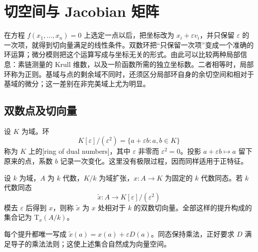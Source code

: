 
% 
% 

\section{切空间与 Jacobian 矩阵}
\label{g5:sec:0503}

在方程 \(f(x_1,\ldots,x_n)=0\) 上选定一点以后，把坐标改为 \(x_i+\varepsilon v_i\)，并只保留 \(\varepsilon\) 的一次项，就得到切向量满足的线性条件。双数环把“只保留一次项”变成一个准确的环运算；微分模则把这个运算写成与坐标无关的形式。由此可以比较两种局部信息：素链测量的 Krull 维数，以及一阶函数所需的独立坐标数。二者相等时，局部环称为正则。基域与点的剩余域不同时，还须区分局部环自身的余切空间和相对于基域的微分；这一差别在非完美域上尤为明显。

\subsection{双数点及切向量}
\label{g5:subsec:0503:01}

设 \(K\) 为域。环
\[
	K[\varepsilon]/(\varepsilon^2)
	=\{a+\varepsilon b:a,b\in K\}
\]
称为 \(K\) 上的[ring of dual numbers]，其中 \(\varepsilon\) 非零而 \(\varepsilon^2=0\)。投影 \(a+\varepsilon b\mapsto a\) 留下原来的点，系数 \(b\) 记录一次变化。这里没有极限过程，因而同样适用于正特征。

\begin{definition}\label{g5:def:dual-number-tangent}
	设 \(k\) 为域，\(A\) 为 \(k\) 代数，\(K/k\) 为域扩张，\(x:A\to K\) 为固定的 \(k\) 代数同态。若 \(k\) 代数同态
	\[
		\widetilde x:A\longrightarrow K[\varepsilon]/(\varepsilon^2)
	\]
	模去 \(\varepsilon\) 后得到 \(x\)，则称 \(\widetilde x\) 为 \(x\) 处相对于 \(k\) 的双数切向量。全部这样的提升构成的集合记为 \(\mathrm{T}_x(A/k)\)。
\end{definition}

每个提升都唯一写成 \(\widetilde x(a)=x(a)+\varepsilon D(a)\)。同态保持乘法，正好要求 \(D\) 满足导子的乘法法则；这使上述集合自然成为向量空间。

